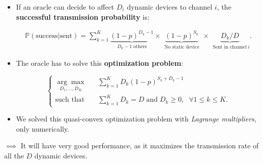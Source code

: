 \begin{frameO}

    \begin{itemize}
        \item
              If an oracle can decide to affect \(D_i\) dynamic devices to channel
              \(i\), the \textbf{successful transmission probability} is:
              \vspace*{-10pt}

              \begin{small} \begin{align*}
                      \mathbb{P}(\text{success}|\text{sent}) = \sum_{k=1}^{K} \underbrace{(1 - p)^{D_k - 1}}_{\;\;D_k - 1 \;\text{others}\;\;} \times \underbrace{(1 - p)^{S_k}}_{\;\;\text{No static device}\;\;} \times \underbrace{ D_k / D }_{\;\;\text{Sent in channel}\; i}.
                  \end{align*} \end{small}
              \pause
        \item
              The oracle has to solve this \textbf{optimization problem}:
              \vspace*{-5pt}

              \begin{small} \begin{equation*} \begin{cases}
                          \underset{D_1,\dots,D_{K}}{\arg\max}\;\;\; & \sum\limits_{k=1}^{K} D_k (1 - p)^{S_k + D_k -1}                                           \\
                          \text{such that}\;\;\;                     & \sum\limits_{k=1}^{K} D_k = D \; \text{and} \; D_k \geq 0, \; \; \forall 1 \leq k \leq K .
                      \end{cases} \end{equation*} \end{small}
        \item
              We solved this quasi-convex optimization problem with \emph{Lagrange
                  multipliers}, only numerically.
    \end{itemize}

    \vfill{}
    \(\implies\) It will have very good performance, as it maximizes the transmission rate
    of all the \(D\) dynamic devices.

\end{frameO}

